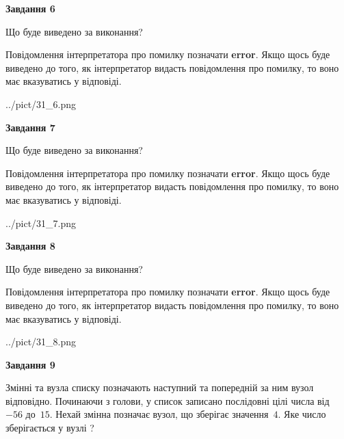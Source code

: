 \documentclass[12pt, ukrainian]{article}
\begin{document}
{\begin {large}
{\begin {center}\textbf{Завдання 6}\end {center}}\par
Що буде виведено за виконання?

Повідомлення інтерпретатора про помилку позначати \textbf{error}.
Якщо щось буде виведено до того, як інтерпретатор видасть повідомлення про помилку, 
то воно має вказуватись у відповіді. \par


\begin{center}
	{../pict/31_6.png}
\end{center}
\newpage

{\begin {center}\textbf{Завдання 7}\end {center}}\par
Що буде виведено за виконання?

Повідомлення інтерпретатора про помилку позначати \textbf{error}.
Якщо щось буде виведено до того, як інтерпретатор видасть повідомлення про помилку, 
то воно має вказуватись у відповіді. \par


\begin{center}
	{../pict/31_7.png}
\end{center}
\newpage

{\begin {center}\textbf{Завдання 8}\end {center}}\par
Що буде виведено за виконання?

Повідомлення інтерпретатора про помилку позначати \textbf{error}.
Якщо щось буде виведено до того, як інтерпретатор видасть повідомлення про помилку, 
то воно має вказуватись у відповіді. \par


\begin{center}
	{../pict/31_8.png}
\end{center}
\newpage

{\begin {center}\textbf{Завдання 9}\end {center}}\par
Змінні  та  вузла списку позначають наступний та попередній за ним вузол відповідно. Починаючи з голови, у список записано послідовні цілі числа від~$-56$ до~$15$. Нехай змінна  позначає вузол, що зберігає значення~$4$.
Яке число зберігається у вузлі  ?\par
\newpage


\end{large}}
\end{document}
